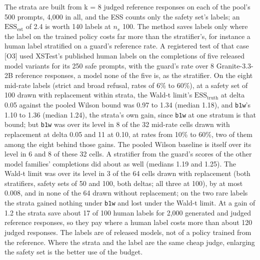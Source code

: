 \documentclass[11pt]{article}
\begin{document}
The strata are built from k = 8 judged reference responses on each of the pool's 500 prompts, 4,000 in all, and the ESS counts only the safety set's labels; an $\mathrm{ESS}_{\mathrm{est}}$ of 2.4 is worth 140 labels at $n_{s}$ 100. The method saves labels only where the label on the trained policy costs far more than the stratifier's, for instance a human label stratified on a guard's reference rate. A registered test of that case [O3] used XSTest's published human labels on the completions of five released model variants for its 250 safe prompts, with the guard's rate over 8 Granite-3.3-2B reference responses, a model none of the five is, as the stratifier. On the eight mid-rate labels (strict and broad refusal, rates of 6\% to 60\%), at a safety set of 100 drawn with replacement within strata, the Wald-t limit's $\mathrm{ESS}_{\mathrm{truth}}$ at delta 0.05 against the pooled Wilson bound was 0.97 to 1.34 (median 1.18), and \texttt{b1w}'s 1.10 to 1.36 (median 1.24), the strata's own gain, since \texttt{b1w} at one stratum is that bound; but \texttt{b1w} was over its level in 8 of the 32 mid-rate cells drawn with replacement at delta 0.05 and 11 at 0.10, at rates from 10\% to 60\%, two of them among the eight behind those gains. The pooled Wilson baseline is itself over its level in 6 and 8 of these 32 cells. A stratifier from the guard's scores of the other model families' completions did about as well (medians 1.19 and 1.25). The Wald-t limit was over its level in 3 of the 64 cells drawn with replacement (both stratifiers, safety sets of 50 and 100, both deltas; all three at 100), by at most 0.008, and in none of the 64 drawn without replacement; on the two rare labels the strata gained nothing under \texttt{b1w} and lost under the Wald-t limit. At a gain of 1.2 the strata save about 17 of 100 human labels for 2,000 generated and judged reference responses, so they pay where a human label costs more than about 120 judged responses. The labels are of released models, not of a policy trained from the reference. Where the strata and the label are the same cheap judge, enlarging the safety set is the better use of the budget.
\end{document}
